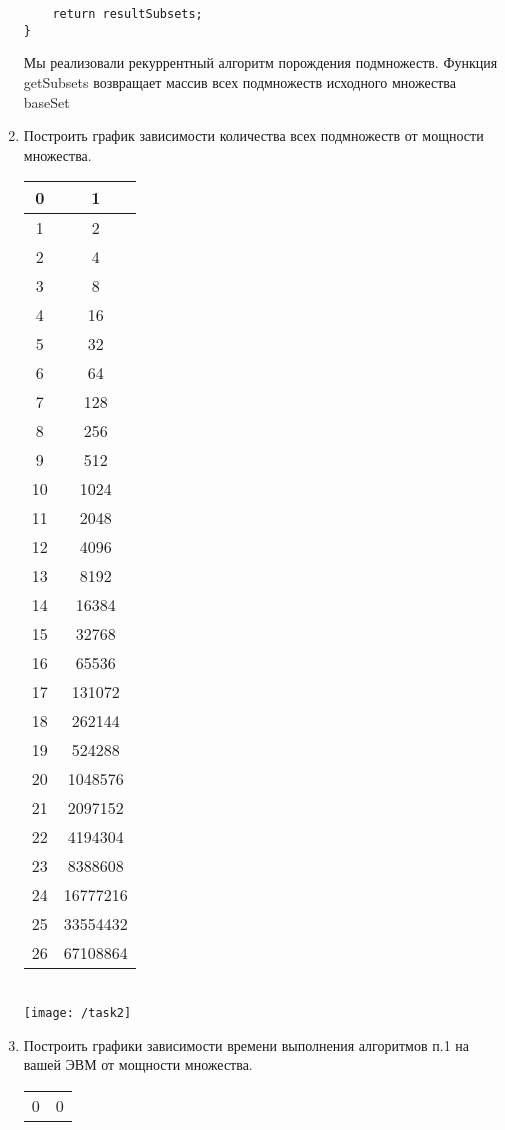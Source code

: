 \documentclass[a4paper,14pt]{extarticle}
\begin{document}
\begin{enumerate}[№1. ]
\begin{verbatim}
	return resultSubsets;
}
\end{verbatim}
Мы реализовали рекуррентный алгоритм порождения подмножеств. Функция getSubsets возвращает массив всех подмножеств исходного множества baseSet
\item Построить график зависимости количества всех подмножеств от мощности множества.\bigbreak
\begin{center}
\begin{tabular}{ cc} 
	\hline
	0&1\\
	\hline
	1&2\\
	\hline
	2&4\\
	\hline
	3&8\\
	\hline
	4&16\\
	\hline
	5&32\\
	\hline
	6&64\\
	\hline
	7&128\\
	\hline
	8&256\\
	\hline
	9&512\\
	\hline
	10&1024\\
	\hline
	11&2048\\
	\hline
	12&4096\\
	\hline
	13&8192 \\
	\hline
	14&16384\\
	\hline
	15&32768\\
	\hline
	16&65536\\
	\hline
	17&131072\\
	\hline
	18&262144\\
	\hline
	19&524288\\
	\hline
	20&1048576\\
	\hline
	21&2097152\\
	\hline
	22&4194304\\
	\hline
	23&8388608\\
	\hline
	24&16777216\\
	\hline
	25&33554432\\
	\hline
	26&67108864\\
	\hline
\end{tabular}\\
\texttt{[image: /task2]}\\
\end{center}
\item Построить графики зависимости времени выполнения алгоритмов п.1 на вашей ЭВМ от мощности множества.\bigbreak
\begin{center}
\begin{tabular}{ cc} 
	\hline
	0&0\\

\end{tabular}
\end{center}
\end{enumerate}
\end{document}
